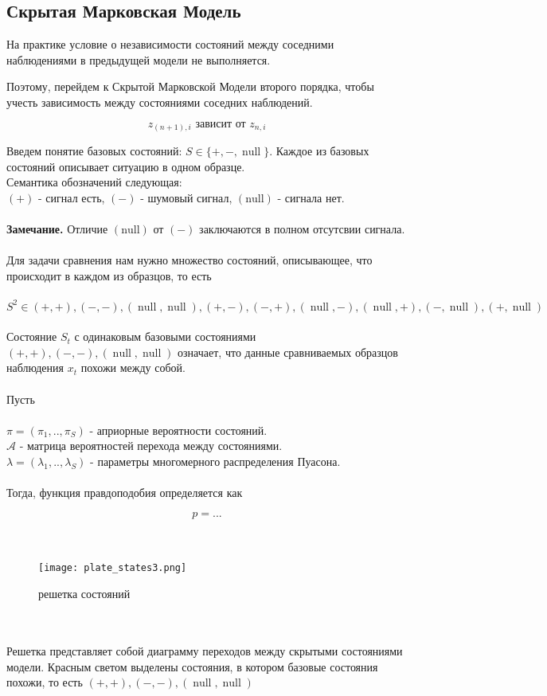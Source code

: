\documentclass{matmex-diploma}
\begin{document}
\subsection{Скрытая Марковская Модель}

На практике условие о независимости  состояний между соседними наблюдениями в предыдущей модели не выполняется.

Поэтому, перейдем к Скрытой Марковской Модели второго порядка, чтобы учесть зависимость между состояниями соседних наблюдений.

\[
z_{(n+1),i} \mbox{ зависит от } z_{n,i}
\]

Введем понятие базовых состояний: $ S \in \{+, -, \operatorname{null}\}$.
Каждое из базовых состояний описывает ситуацию в одном образце. 
\\
Семантика обозначений следующая:
\\
$(+)$ - сигнал есть,  $(-)$ - шумовый сигнал, $\operatorname{(null)}$ - сигнала нет.
\\\\
\textbf{Замечание.} Отличие $\operatorname{(null)}$ от $(-)$ заключаются в полном отсутсвии сигнала.
\\\\
Для задачи сравнения нам нужно множество состояний, описывающее, что происходит в каждом из образцов, то есть
\\\\
$S^2 \in {(+,+),(-,-),(\operatorname{null},\operatorname{null}),
(+,-),(-,+),(\operatorname{null},-),(\operatorname{null},+),(-,\operatorname{null}),(+,\operatorname{null})}$
\\\\
Состояние $S_t$ с одинаковым базовыми состояниями $(+,+),(-,-),(\operatorname{null},\operatorname{null})$ означает, что данные сравниваемых образцов наблюдения $x_t$ похожи между собой.
\\\\
Пусть
\\\\
$\pi = (\pi_1,..,\pi_S)$ - априорные вероятности состояний.
\\
$\mathcal{A}$ - матрица вероятностей перехода между состояниями.
\\
$\lambda = (\lambda_1,..,\lambda_S)$ - параметры многомерного распределения Пуасона.
\\\\
Тогда, функция правдоподобия определяется как

$$p = ...$$
\\\\
\begin{figure}[h]
\label{разрыв_функции}
\centering
\texttt{[image: plate\_states3.png]}
\caption{решетка состояний}
\end{figure}
\\\\
Решетка представляет собой диаграмму переходов между скрытыми состояниями модели. Красным светом выделены состояния, в котором базовые состояния похожи, то есть $(+,+),(-,-),(\operatorname{null},\operatorname{null})$
\end{document}
